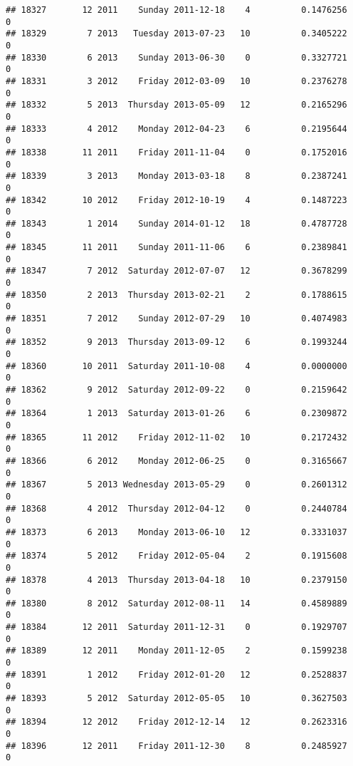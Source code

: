 \documentclass[
]{article}
\begin{document}
\begin{verbatim}
## 18327       12 2011    Sunday 2011-12-18    4          0.1476256             0
## 18329        7 2013   Tuesday 2013-07-23   10          0.3405222             0
## 18330        6 2013    Sunday 2013-06-30    0          0.3327721             0
## 18331        3 2012    Friday 2012-03-09   10          0.2376278             0
## 18332        5 2013  Thursday 2013-05-09   12          0.2165296             0
## 18333        4 2012    Monday 2012-04-23    6          0.2195644             0
## 18338       11 2011    Friday 2011-11-04    0          0.1752016             0
## 18339        3 2013    Monday 2013-03-18    8          0.2387241             0
## 18342       10 2012    Friday 2012-10-19    4          0.1487223             0
## 18343        1 2014    Sunday 2014-01-12   18          0.4787728             0
## 18345       11 2011    Sunday 2011-11-06    6          0.2389841             0
## 18347        7 2012  Saturday 2012-07-07   12          0.3678299             0
## 18350        2 2013  Thursday 2013-02-21    2          0.1788615             0
## 18351        7 2012    Sunday 2012-07-29   10          0.4074983             0
## 18352        9 2013  Thursday 2013-09-12    6          0.1993244             0
## 18360       10 2011  Saturday 2011-10-08    4          0.0000000             0
## 18362        9 2012  Saturday 2012-09-22    0          0.2159642             0
## 18364        1 2013  Saturday 2013-01-26    6          0.2309872             0
## 18365       11 2012    Friday 2012-11-02   10          0.2172432             0
## 18366        6 2012    Monday 2012-06-25    0          0.3165667             0
## 18367        5 2013 Wednesday 2013-05-29    0          0.2601312             0
## 18368        4 2012  Thursday 2012-04-12    0          0.2440784             0
## 18373        6 2013    Monday 2013-06-10   12          0.3331037             0
## 18374        5 2012    Friday 2012-05-04    2          0.1915608             0
## 18378        4 2013  Thursday 2013-04-18   10          0.2379150             0
## 18380        8 2012  Saturday 2012-08-11   14          0.4589889             0
## 18384       12 2011  Saturday 2011-12-31    0          0.1929707             0
## 18389       12 2011    Monday 2011-12-05    2          0.1599238             0
## 18391        1 2012    Friday 2012-01-20   12          0.2528837             0
## 18393        5 2012  Saturday 2012-05-05   10          0.3627503             0
## 18394       12 2012    Friday 2012-12-14   12          0.2623316             0
## 18396       12 2011    Friday 2011-12-30    8          0.2485927             0

\end{verbatim}
\end{document}
